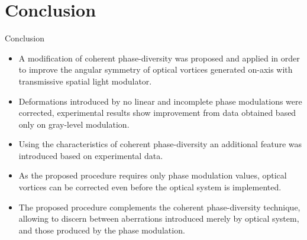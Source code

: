 \documentclass[10pt]{beamer}
\begin{document}
\section{Conclusion}
\begin{frame}{Conclusion}
\begin{itemize}

\item<1-> A modification of coherent phase-diversity was proposed and applied in order to improve the angular symmetry of optical vortices generated on-axis with transmissive spatial light modulator.

\item<2-> Deformations introduced by no linear and incomplete phase modulations were corrected, experimental results show improvement from data obtained based only on gray-level modulation.

\item<3-> Using the characteristics of coherent phase-diversity an additional feature was introduced based on experimental data.

\item<4-> As the proposed procedure requires only phase modulation values, optical vortices can be corrected even before the optical system is implemented.

\item<5-> The proposed procedure complements the coherent phase-diversity technique, allowing to discern between aberrations introduced merely by optical system, and those produced by the phase modulation.




\end{itemize}
\end{frame}
\end{document}
